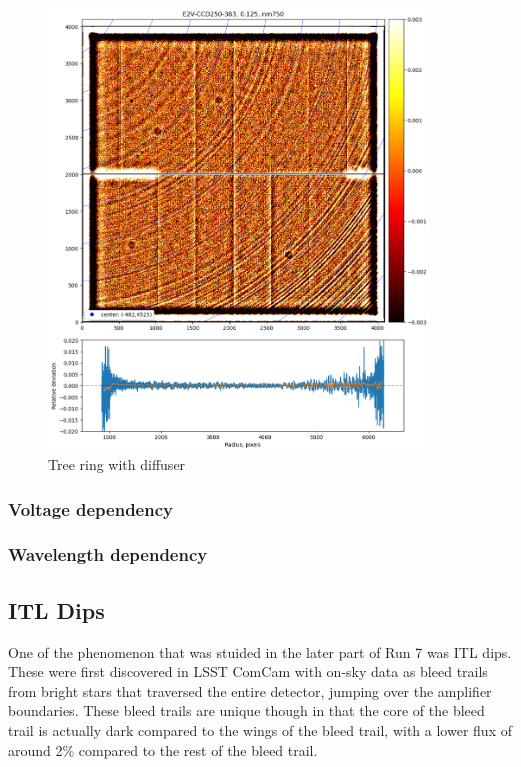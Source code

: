 \begin{figure}
\begin{centering}
\includegraphics[width=0.9\textwidth]{sections/figures/TR_w_diffuser.png}
\end{centering}
\caption{Tree ring with diffuser}
\end{figure}


\subsubsection{Voltage dependency}
\subsubsection{Wavelength dependency}


\subsection{ITL Dips}\label{itl-dips}

One of the phenomenon that was stuided in the later part of Run 7 was
ITL dips. These were first discovered in LSST ComCam with on-sky data as
bleed trails from bright stars that traversed the entire detector,
jumping over the amplifier boundaries. These bleed trails are unique
though in that the core of the bleed trail is actually
\textquotesingle dark\textquotesingle{} compared to the wings of the
bleed trail, with a lower flux of around 2\% compared to the rest of the
bleed trail.

